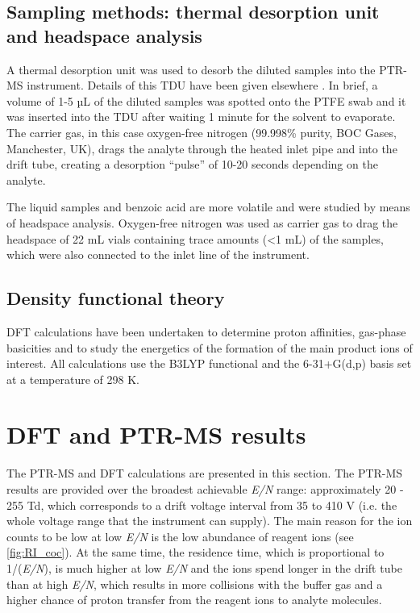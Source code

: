 \subsection{Sampling methods: thermal desorption unit and headspace analysis}
A thermal desorption unit was used to desorb the diluted samples into the PTR-MS instrument. Details of this TDU have been given elsewhere \cite{RN445}. In brief, a volume of 1-5 µL of the diluted samples was spotted onto the PTFE swab and it was inserted into the TDU after waiting 1 minute for the solvent to evaporate. The carrier gas, in this case oxygen-free nitrogen (99.998\% purity, BOC Gases, Manchester, UK), drags the analyte through the heated inlet pipe and into the drift tube, creating a desorption “pulse” of 10-20 seconds depending on the analyte.

The liquid samples and benzoic acid are more volatile and were studied by means of headspace analysis. Oxygen-free nitrogen was used as carrier gas to drag the headspace of 22 mL vials containing trace amounts (<1 mL) of the samples, which were also connected to the inlet line of the instrument. 

\subsection{Density functional theory}
DFT calculations have been undertaken to determine  proton affinities,  gas-phase basicities  and to study the energetics of the formation of the main product ions of interest. All calculations use the B3LYP functional and the 6-31+G(d,p) basis set at a temperature of 298 K.


\section{DFT and PTR-MS results}
The PTR-MS and DFT calculations are  presented in this section. The PTR-MS results are provided over the broadest achievable \textit{E/N} range: approximately 20 - 255 Td, which corresponds to a drift voltage interval from 35 to 410 V (i.e. the whole  voltage range that the instrument can supply). 
The main reason for the ion counts to be low at low \textit{E/N} is the low abundance of reagent ions (see \autoref{fig:RI_coc}). 
At the same time, the residence time, which is proportional to 1/(\textit{E/N}), is much higher at low \textit{E/N} and the ions spend longer in the drift tube than at high \textit{E/N}, which results in more collisions with the buffer gas and a higher chance of proton transfer from the reagent ions to analyte molecules. 
%
%



